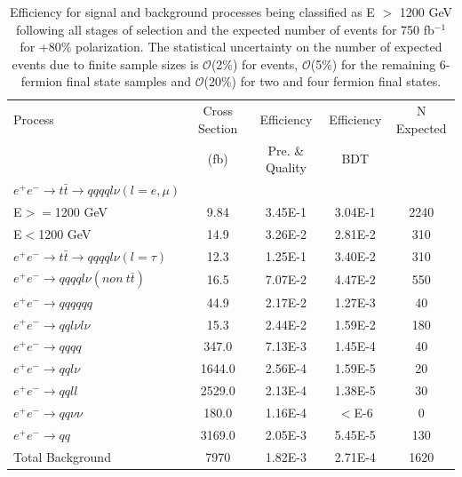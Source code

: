 \begin{table}
  \centering
  \begin{tabular}{l | c | c | c | c}
    \toprule
    Process     & Cross Section & Efficiency & Efficiency & N Expected\\
         & (fb) & Pre. \& Quality & BDT & \\
    \midrule
    $e^+e^-\rightarrow t\bar{t} \rightarrow qqqql\nu (l=e,\mu)$ &  & \\
    E$>=$1200 GeV & 9.84 & 3.45E-1 & 3.04E-1 & 2240\\
    E$<$1200 GeV & 14.9 & 3.26E-2 & 2.81E-2 & 310 \\
   \midrule
    $e^+e^-\rightarrow t\bar{t} \rightarrow qqqql\nu (l=\tau)$& 12.3 & 1.25E-1 & 3.40E-2 & 310\\
    \midrule
    $e^+e^-\rightarrow qqqql\nu (non ~ t\bar{t})$& 16.5 & 7.07E-2 & 4.47E-2 & 550\\
    \midrule
    $e^+e^-\rightarrow qqqqqq$ & 44.9 & 2.17E-2 & 1.27E-3 & 40 \\
    \midrule
    $e^+e^-\rightarrow qql\nu l\nu$ & 15.3  & 2.44E-2 & 1.59E-2 & 180 \\
    \midrule
    $e^+e^-\rightarrow qqqq$ & 347.0 & 7.13E-3 & 1.45E-4 & 40 \\
    \midrule
    $e^+e^-\rightarrow qql\nu$ & 1644.0 & 2.56E-4 & 1.59E-5 & 20\\
    \midrule
    $e^+e^-\rightarrow qqll$ & 2529.0 & 2.13E-4 & 1.38E-5 & 30 \\
    \midrule
    $e^+e^-\rightarrow qq\nu\nu$ & 180.0 & 1.16E-4 & $<$E-6 & 0 \\
    \midrule
    $e^+e^-\rightarrow qq$ & 3169.0 & 2.05E-3 & 5.45E-5 & 130 \\
    \midrule
    \midrule
    Total Background & 7970 & 1.82E-3 & 2.71E-4 & 1620\\
    \bottomrule
  \end{tabular}
  \caption{Efficiency for signal and background processes being classified as E $>$ 1200 GeV following all stages of selection and the expected number of events for 750 fb$^{-1}$ for +80\% polarization. The statistical uncertainty on the number of expected events due to finite sample sizes is $\mathcal{O}$(2\%) for \ttbar events, $\mathcal{O}$(5\%) for the remaining 6-fermion final state samples and $\mathcal{O}$(20\%) for two and four fermion final states.}
  \label{table:topfinalefficienciespos}
\end{table}

